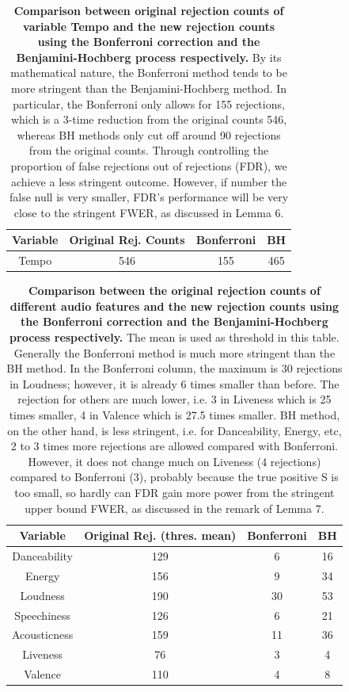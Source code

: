 \documentclass[12pt]{article}
\theoremstyle{plain}
\theoremstyle{definition}
\theoremstyle{remark}
\begin{document}
\begin{table}[h!]
    \centering
    \begin{tabular}{|c|c|c|c|}
        \hline
        Variable & Original Rej. Counts & Bonferroni & BH\\
        \hline
        Tempo & 546 & 155 & 465\\
        \hline
    \end{tabular}
    \caption{\textbf{Comparison between original rejection counts of variable Tempo and the new rejection counts using the Bonferroni correction and the Benjamini-Hochberg process respectively.} By its mathematical nature, the Bonferroni method tends to be more stringent than the Benjamini-Hochberg method. In particular, the Bonferroni only allows for 155 rejections, which is a 3-time reduction from the original counts 546, whereas BH methods only cut off around 90 rejections from the original counts. Through controlling the proportion of false rejections out of rejections (FDR), we achieve a less stringent outcome. However, if number the false null is very smaller, FDR's performance will be very close to the stringent FWER, as discussed in Lemma 6.}
    \label{table 4}
\end{table}

\begin{table}[h!]
    \centering
    \begin{tabular}{|c|c|c|c|}
       \hline
       Variable & Original Rej. (thres. mean) & Bonferroni & BH \\
       \hline
        Danceability &129 &6&16\\
        \hline
        Energy &156 &9&34\\
        \hline
        Loudness &190 &30&53\\
        \hline
        Speechiness &126 &6&21\\
        \hline
        Acousticness &159 &11&36\\
        \hline
        Liveness & 76&3&4\\
        \hline
        Valence & 110&4&8\\
        \hline
    \end{tabular}
    \caption{\textbf{Comparison between the original rejection counts of different audio features and the new rejection counts using the Bonferroni correction and the Benjamini-Hochberg process respectively.} The mean is used as threshold in this table. Generally the Bonferroni method is much more stringent than the BH method. In the Bonferroni column, the maximum is 30 rejections in Loudness; however, it is already 6 times smaller than before. The rejection for others are much lower, i.e. 3 in Liveness which is 25 times smaller, 4 in Valence which is 27.5 times smaller. BH method, on the other hand, is less stringent, i.e. for Danceability, Energy, etc, 2 to 3 times more rejections are allowed compared with Bonferroni. However, it does not change much on Liveness (4 rejections) compared to Bonferroni (3), probably because the true positive S is too small, so hardly can FDR gain more power from the stringent upper bound FWER, as discussed in the remark of Lemma 7. }
    \label{table 5}
\end{table}
\end{document}
